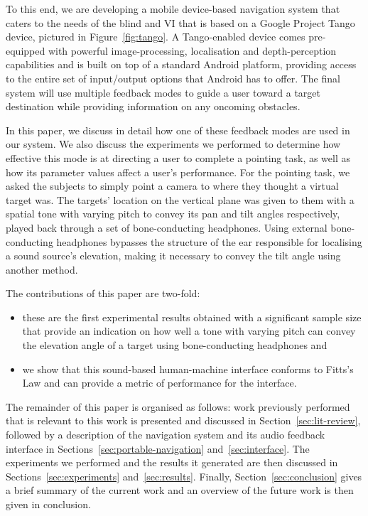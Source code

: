 \documentclass[format=sigconf, review=true, screen=true, anonymous=true]{acmart}
\begin{document}
To this end, we are developing a mobile device-based navigation system that caters to the needs of the blind and VI that is based on a Google Project Tango device, pictured in Figure~\ref{fig:tango}. A Tango-enabled device comes pre-equipped with powerful image-processing, localisation and depth-perception capabilities and is built on top of a standard Android platform, providing access to the entire set of input/output options that Android has to offer. The final system will use multiple feedback modes to guide a user toward a target destination while providing information on any oncoming obstacles.

In this paper, we discuss in detail how one of these feedback modes are used in our system. We also discuss the experiments we performed to determine how effective this mode is at directing a user to complete a pointing task, as well as how its parameter values affect a user's performance. For the pointing task, we asked the subjects to simply point a camera to where they thought a virtual target was. The targets' location on the vertical plane was given to them with a spatial tone with varying pitch to convey its pan and tilt angles respectively, played back through a set of bone-conducting headphones. Using external bone-conducting headphones bypasses the structure of the ear responsible for localising a sound source's elevation, making it necessary to convey the tilt angle using another method. 

The contributions of this paper are two-fold: 

\begin{itemize}
  \item these are the first experimental results obtained with a significant sample size that provide an indication on how well a tone with varying pitch can convey the elevation angle of a target using bone-conducting headphones and 
  \item we show that this sound-based human-machine interface conforms to Fitts's Law and can provide a metric of performance for the interface.
\end{itemize}

The remainder of this paper is organised as follows: work previously performed that is relevant to this work is presented and discussed in Section~\ref{sec:lit-review}, followed by a description of the navigation system and its audio feedback interface in Sections~\ref{sec:portable-navigation} and~\ref{sec:interface}. The experiments we performed and the results it generated are then discussed in Sections~\ref{sec:experiments} and~\ref{sec:results}. Finally, Section~\ref{sec:conclusion} gives a brief summary of the current work and an overview of the future work is then given in conclusion. 
\end{document}
